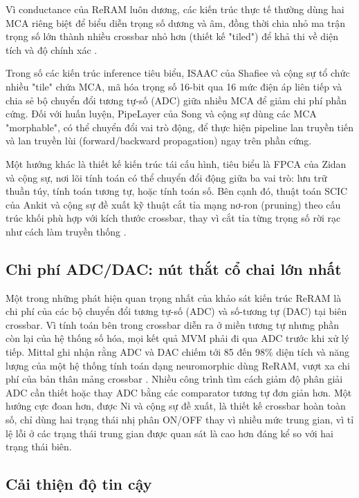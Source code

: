\documentclass[12pt,a4paper]{article}
\begin{document}
Vì conductance của ReRAM luôn dương, các kiến trúc thực tế thường dùng hai MCA riêng biệt để biểu diễn trọng số dương và âm, đồng thời chia nhỏ ma trận trọng số lớn thành nhiều crossbar nhỏ hơn (thiết kế "tiled") để khả thi về diện tích và độ chính xác \cite{mittal2019}.

Trong số các kiến trúc inference tiêu biểu, ISAAC của Shafiee và cộng sự tổ chức nhiều "tile" chứa MCA, mã hóa trọng số 16-bit qua 16 mức điện áp liên tiếp và chia sẻ bộ chuyển đổi tương tự-số (ADC) giữa nhiều MCA để giảm chi phí phần cứng. Đối với huấn luyện, PipeLayer của Song và cộng sự dùng các MCA "morphable", có thể chuyển đổi vai trò động, để thực hiện pipeline lan truyền tiến và lan truyền lùi (forward/backward propagation) ngay trên phần cứng.

Một hướng khác là thiết kế kiến trúc tái cấu hình, tiêu biểu là FPCA của Zidan và cộng sự, nơi lõi tính toán có thể chuyển đổi động giữa ba vai trò: lưu trữ thuần túy, tính toán tương tự, hoặc tính toán số. Bên cạnh đó, thuật toán SCIC của Ankit và cộng sự đề xuất kỹ thuật cắt tỉa mạng nơ-ron (pruning) theo cấu trúc khối phù hợp với kích thước crossbar, thay vì cắt tỉa từng trọng số rời rạc như cách làm truyền thống \cite{mittal2019}.

\subsection{Chi phí ADC/DAC: nút thắt cổ chai lớn nhất}

Một trong những phát hiện quan trọng nhất của khảo sát kiến trúc ReRAM là chi phí của các bộ chuyển đổi tương tự-số (ADC) và số-tương tự (DAC) tại biên crossbar. Vì tính toán bên trong crossbar diễn ra ở miền tương tự nhưng phần còn lại của hệ thống số hóa, mọi kết quả MVM phải đi qua ADC trước khi xử lý tiếp. Mittal ghi nhận rằng ADC và DAC chiếm tới 85 đến 98\% diện tích và năng lượng của một hệ thống tính toán dạng neuromorphic dùng ReRAM, vượt xa chi phí của bản thân mảng crossbar \cite{mittal2019}. Nhiều công trình tìm cách giảm độ phân giải ADC cần thiết hoặc thay ADC bằng các comparator tương tự đơn giản hơn. Một hướng cực đoan hơn, được Ni và cộng sự đề xuất, là thiết kế crossbar hoàn toàn số, chỉ dùng hai trạng thái nhị phân ON/OFF thay vì nhiều mức trung gian, vì tỉ lệ lỗi ở các trạng thái trung gian được quan sát là cao hơn đáng kể so với hai trạng thái biên.

\subsection{Cải thiện độ tin cậy}
\end{document}
